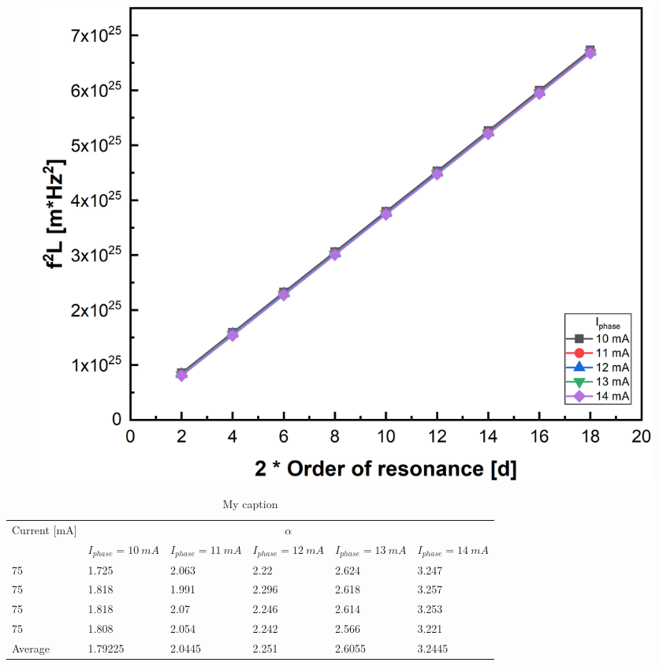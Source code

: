 \begin{figure}[!htb]
    \centering
    \includegraphics[width=.7\linewidth]{figures/chirp_6559.png}
    \caption{}
    \label{fig:chirp_6559}
\end{figure}

\begin{table}[!htb]
    \centering
    \caption{My caption}
    \label{my-label}
    \begin{tabular}{@{}llllll@{}}
    \toprule
    \multirow{2}{*}{Current {[}mA{]}} & \multicolumn{5}{c}{$\alpha$}                                                                                \\ \cmidrule(l){2-6} 
                                      & $I_{phase}=10 \ mA$ & $I_{phase}=11 \ mA$ & $I_{phase}=12 \ mA$ & $I_{phase}=13 \ mA$ & $I_{phase}=14 \ mA$ \\ \midrule
    75                                & 1.725               & 2.063               & 2.22                & 2.624               & 3.247               \\
    75                                & 1.818               & 1.991               & 2.296               & 2.618               & 3.257               \\
    75                                & 1.818               & 2.07                & 2.246               & 2.614               & 3.253               \\
    75                                & 1.808               & 2.054               & 2.242               & 2.566               & 3.221               \\ \midrule
    Average                           & 1.79225             & 2.0445              & 2.251               & 2.6055              & 3.2445              \\ \bottomrule
    \end{tabular}
\end{table}